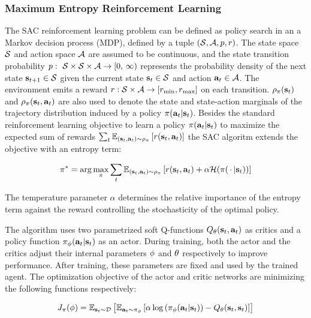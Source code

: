 \documentclass[a4paper, fleqn]{template/cas-dc}
\begin{document}
	\subsubsection{Maximum Entropy Reinforcement Learning}
	The SAC reinforcement learning problem can be defined as policy search in an a Markov decision process (MDP), defined by a tuple $(\mathcal{S}, \mathcal{A}, p, r)$. The state space $\mathcal{S}$ and action space $\mathcal{A}$ are assumed to be continuous, and the state transition probability $\pdyn:\ \sspace \times \sspace \times \aspace \rightarrow [0,\, \infty)$ represents the probability density of the next state ${\mathbf{s}_{t+1}}\in\mathcal{S}$ given the current state ${\mathbf{s}_t}\in\mathcal{S}$ and action ${\mathbf{a}_t}\in\mathcal{A}$. The environment emits a reward $r: \mathcal{S} \times \mathcal{A} \rightarrow  [r_\mathrm{min},r_\mathrm{max}]$ on each transition. $\rho_\pi({\mathbf{s}_t})$ and $\rho_\pi({\mathbf{s}_t},{\mathbf{a}_t})$ are also used to denote the state and state-action marginals of the trajectory distribution induced by a policy $\pi({\mathbf{a}_t}|{\mathbf{s}_t})$.  Besides the standard reinforcement learning objective to learn a policy $\pi({\mathbf{a}_t}|{\mathbf{s}_t})$ to maximize the expected sum of rewards $\sum_t \operatorname{\mathbb{E}}_{({\mathbf{s}_t},{\mathbf{a}_t})\sim\rho_\pi}\left[r({\mathbf{s}_t},{\mathbf{a}_t})\right]$ the SAC algoritm extends the objective with an entropy term:
	
	\begin{align}
		\label{eq:sql:maxent_objective}
		\pi^* = \arg\max_{\pi} \sum_{t} \operatorname{\mathbb{E}}_{({\mathbf{s}_t}, {\mathbf{a}_t}) \sim \rho_\pi}\left[r({\mathbf{s}_t},{\mathbf{a}_t}) + \alpha\mathcal{H}(\pi({\,\cdot\,}|{\mathbf{s}_t}))\right]
	\end{align}
	
	The temperature parameter $\alpha$ determines the relative importance of the entropy term against the reward controlling the stochasticity of the optimal policy.
	
	The algorithm uses two parametrized soft Q-functions $Q_\theta({\mathbf{s}_t}, {\mathbf{a}_t})$ as critics and a policy function  $\pi_{\phi}({\mathbf{a}_t}|{\mathbf{s}_t})$ as an actor. During training, both the actor and the critics adjust their internal parameters ${\phi}$ and $\theta$ respectively to improve performance. After training, these parameters are fixed and used by the trained agent. The optimization objective of the actor and critic networks are minimizing the following functions respectively:
	
	\begin{align}
		J_\pi({\phi}) = \operatorname{\mathbb{E}}_{{\mathbf{s}_t}\sim\mathcal{D}}\left[\operatorname{\mathbb{E}}_{{\mathbf{a}_t}\sim\pi_{\phi}}\left[\alpha \log\left(\pi_{\phi}({\mathbf{a}_t}|{\mathbf{s}_t})\right) - Q_\theta({\mathbf{s}_t}, {\mathbf{s}_t})\right]\right]
	\end{align}
	
\end{document}
